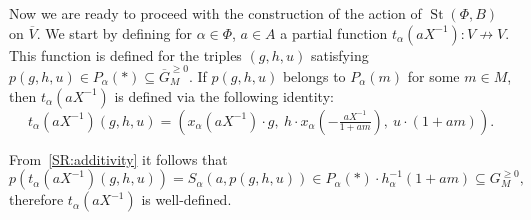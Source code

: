 \documentclass[oneside, 8pt]{amsart}
\theoremstyle{remark}
\theoremstyle{definition}
\numberwithin{lemma}{section}
\numberwithin{prop}{section}
\numberwithin{corollary}{section}
\numberwithin{externaltheorem}{section}
\DeclareMathOperator{\St}{St}
\numberwithin{equation}{section}
\begin{document}
Now we are ready to proceed with the construction of the action of $\St(\Phi, B)$ on $\overline{V}$. We start by defining for $\alpha \in \Phi$, $a \in A$ a partial function $t_\alpha(aX^{-1}) \colon V \not\to V$.
This function is defined for the triples $(g, h, u)$ satisfying $p(g, h, u) \in P_\alpha(*) \subseteq \overline{G}_M^{\geq 0}$.
If $p(g, h, u)$ belongs to $P_\alpha(m)$ for some $m \in M$, then $t_\alpha(aX^{-1})$ is defined via the following identity:
\begin{equation} \label{T_1} t_\alpha(aX^{-1}) (g, h, u) = \left( x_\alpha(aX^{-1})\cdot g ,\ h \cdot x_\alpha\left(-\tfrac{aX^{-1}}{1 + am}\right),\ u \cdot (1 + am)\right).\end{equation}

From~\cref{SR:additivity} it follows that
\[p\left(t_\alpha(aX^{-1}) (g, h, u)\right) = S_\alpha(a, p(g, h, u)) \in P_\alpha(*) \cdot h_{\alpha}^{-1}(1+am) \subseteq G_M^{\geq 0},\]
therefore $t_\alpha(aX^{-1})$ is well-defined.
\end{document}
